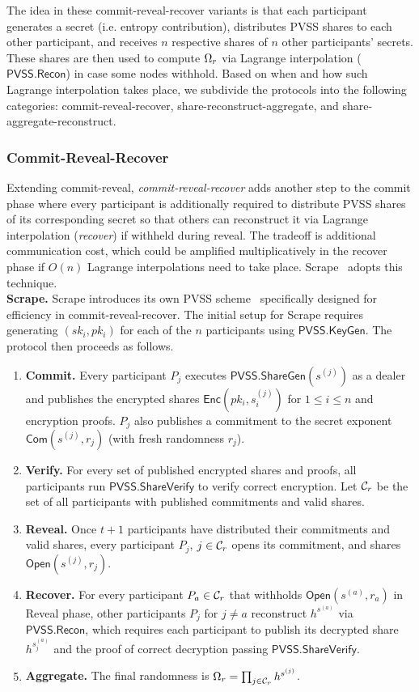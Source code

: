 The idea in these commit-reveal-recover variants is that each participant generates a secret (i.e. entropy contribution), distributes PVSS shares to each other participant, and receives $n$ respective shares of $n$ other participants' secrets. These shares are then used to compute $\Omega_r$ via Lagrange interpolation ($\mathsf{PVSS.Recon}$) in case some nodes withhold. Based on when and how such Lagrange interpolation takes place, we subdivide the protocols into the following categories: commit-reveal-recover, share-reconstruct-aggregate, and share-aggregate-reconstruct.

\subsubsection{Commit-Reveal-Recover}
Extending commit-reveal, \textit{commit-reveal-recover} adds another step to the commit phase where every participant is additionally required to distribute PVSS shares of its corresponding secret so that others can reconstruct it via Lagrange interpolation (\textit{recover}) if withheld during reveal. The tradeoff is additional communication cost, which could be amplified multiplicatively in the recover phase if $O(n)$ Lagrange interpolations need to take place. Scrape~\cite{cascudo2017scrape} adopts this technique.\\

\noindent\textbf{Scrape.} Scrape introduces its own PVSS scheme~\cite{cascudo2017scrape} specifically designed for efficiency in commit-reveal-recover. The initial setup for Scrape requires generating $(sk_i, pk_i)$ for each of the $n$ participants using $\mathsf{PVSS.KeyGen}$. The protocol then proceeds as follows.
\begin{enumerate}
\item \textbf{Commit.} Every participant $P_j$ executes $\mathsf{PVSS.ShareGen}(s^{(j)})$ as a dealer and publishes the encrypted shares $\mathsf{Enc}(pk_i, s^{(j)}_i)$ for $1 \le i \le n$ and encryption proofs. $P_j$ also publishes a commitment to the secret exponent $\mathsf{Com}(s^{(j)}, r_j)$ (with fresh randomness $r_j$).
\item \textbf{Verify.} For every set of published encrypted shares and proofs, all participants run $\mathsf{PVSS.ShareVerify}$ to verify correct encryption. Let $\mathcal{C}_r$ be the set of all participants with published commitments and valid shares.
\item \textbf{Reveal.} Once $t + 1$ participants have distributed their commitments and valid shares, every participant $P_j$, $j \in \mathcal{C}_r$ opens its commitment, and shares $\mathsf{Open}(s^{(j)}, r_j)$.
\item \textbf{Recover.} For every participant $P_a \in \mathcal{C}_r$ that withholds $\mathsf{Open}(s^{(a)}, r_a)$ in Reveal phase, other participants $P_j$ for $j \neq a$ reconstruct $h^{s^{(a)}}$ via $\mathsf{PVSS.Recon}$, which requires each participant to publish its decrypted share $h^{s_j^{(a)}}$ and the proof of correct decryption passing $\mathsf{PVSS.ShareVerify}$.
\item \textbf{Aggregate.} The final randomness is $\Omega_r = \prod_{j \in \mathcal{C}_r} h^{s^{(j)}}$.
\end{enumerate}

